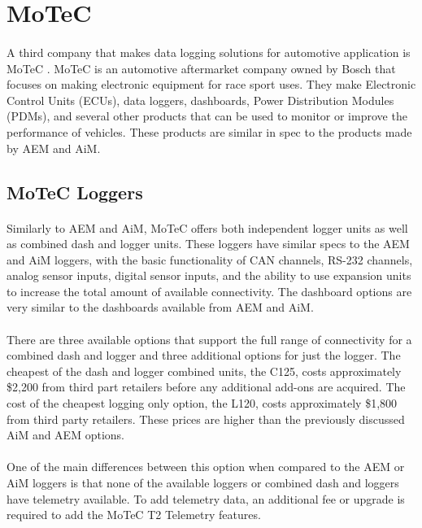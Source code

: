 \section{MoTeC}

\paragraph{}
A third company that makes data logging solutions for automotive application is MoTeC \cite{MoTeCSite}.
MoTeC is an automotive aftermarket company owned by Bosch that focuses on making electronic equipment for race sport uses.
They make Electronic Control Units (ECUs), data loggers, dashboards, Power Distribution Modules (PDMs), and several other products that can be used to monitor or improve the performance of vehicles.
These products are similar in spec to the products made by AEM and AiM.

\subsection{MoTeC Loggers}

\paragraph{}
Similarly to AEM and AiM, MoTeC offers both independent logger units as well as combined dash and logger units.
These loggers have similar specs to the AEM and AiM loggers, with the basic functionality of CAN channels, RS-232 channels, analog sensor inputs, digital sensor inputs, and the ability to use expansion units to increase the total amount of available connectivity.
The dashboard options are very similar to the dashboards available from AEM and AiM.

\paragraph{}
There are three available options that support the full range of connectivity for a combined dash and logger and three additional options for just the logger.
The cheapest of the dash and logger combined units, the C125, costs approximately \$2,200 from third part retailers before any additional add-ons are acquired.
The cost of the cheapest logging only option, the L120, costs approximately \$1,800 from third party retailers.
These prices are higher than the previously discussed AiM and AEM options.

\paragraph{}
One of the main differences between this option when compared to the AEM or AiM loggers is that none of the available loggers or combined dash and loggers have telemetry available.
To add telemetry data, an additional fee or upgrade is required to add the MoTeC T2 Telemetry features.

